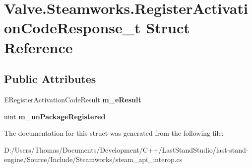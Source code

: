 \hypertarget{structValve_1_1Steamworks_1_1RegisterActivationCodeResponse__t}{}\section{Valve.\+Steamworks.\+Register\+Activation\+Code\+Response\+\_\+t Struct Reference}
\label{structValve_1_1Steamworks_1_1RegisterActivationCodeResponse__t}
\subsection*{Public Attributes}
\begin{DoxyCompactItemize}
\item 
\hypertarget{structValve_1_1Steamworks_1_1RegisterActivationCodeResponse__t_aecb1067feb1826e2774cb911925ba728}{}E\+Register\+Activation\+Code\+Result {\bfseries m\+\_\+e\+Result}\label{structValve_1_1Steamworks_1_1RegisterActivationCodeResponse__t_aecb1067feb1826e2774cb911925ba728}

\item 
\hypertarget{structValve_1_1Steamworks_1_1RegisterActivationCodeResponse__t_acf9d5729df72902f96e819f0543d5b57}{}uint {\bfseries m\+\_\+un\+Package\+Registered}\label{structValve_1_1Steamworks_1_1RegisterActivationCodeResponse__t_acf9d5729df72902f96e819f0543d5b57}

\end{DoxyCompactItemize}


The documentation for this struct was generated from the following file\+:\begin{DoxyCompactItemize}
\item 
D\+:/\+Users/\+Thomas/\+Documents/\+Development/\+C++/\+Last\+Stand\+Studio/last-\/stand-\/engine/\+Source/\+Include/\+Steamworks/steam\+\_\+api\+\_\+interop.\+cs\end{DoxyCompactItemize}
